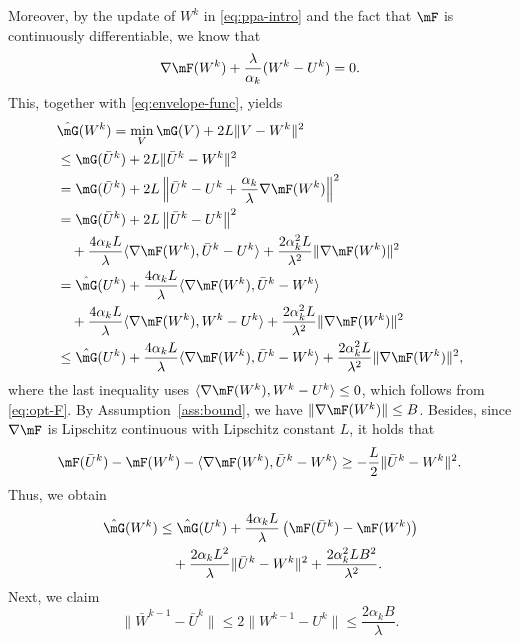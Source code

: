 Moreover, by the update of $W^k$ in \eqref{eq:ppa-intro} and the fact that $\mF$ is continuously differentiable, we know that
\begin{equation}
\label{eq:opt-F}
\nabla \mF(W^k) + \frac{\lambda}{\alpha_k}(W^k - U^k) = 0.
\end{equation} 
This, together with \eqref{eq:envelope-func}, yields
\begin{align*}
& \hat{\mG}(W^k) = \min_V \mG(V) + 2L\|V - W^k\|^2 \\
& \leq \mG(\bar{U}^k) + 2L\|\bar{U}^k - W^k\|^2 \\
& = \mG(\bar{U}^k) + 2L\left\|\bar{U}^k - U^k + \frac{\alpha_k}{\lambda}\nabla\mF(W^k) \right\|^2 \\
& = \mG(\bar{U}^k) + 2L\left\|\bar{U}^k - U^k\right\|^2 \\
& \quad + \frac{4\alpha_kL}{\lambda}\langle \nabla\mF(W^k), \bar{U}^k - U^k \rangle + \frac{2\alpha_k^2L}{\lambda^2}\|\nabla\mF(W^k)\|^2 \\
& = \hat{\mG}(U^k)+ \frac{4\alpha_kL}{\lambda}\langle \nabla\mF(W^k), \bar{U}^k - W^k \rangle \\
& \quad + \frac{4\alpha_kL}{\lambda}\langle \nabla\mF(W^k), W^k - U^k \rangle + \frac{2\alpha_k^2L}{\lambda^2}\|\nabla\mF(W^k)\|^2 \\
& \leq \hat{\mG}(U^k) + \frac{4\alpha_kL}{\lambda}\langle \nabla\mF(W^k), \bar{U}^k - W^k \rangle +  \frac{2\alpha_k^2L}{\lambda^2}\|\nabla\mF(W^k)\|^2,
\end{align*}
where the last inequality uses $\langle \nabla \mF(W^k), W^k - U^k\rangle \leq 0$, which follows from \eqref{eq:opt-F}. By Assumption~\ref{ass:bound}, we have $\|\nabla\mF(W^k)\| \leq B$. Besides, since $\nabla\mF$ is Lipschitz continuous with Lipschitz constant $L$, it holds that
$$ \mF(\bar{U}^k) - \mF(W^k) - \langle \nabla \mF(W^k), \bar{U}^k - W^k \rangle \geq -\frac{L}{2}\|\bar{U}^k - W^k\|^2. $$
Thus, we obtain
\begin{equation}
\label{eq:decrease-F}
\begin{aligned}
\hat{\mG}(W^k) & \leq \hat{\mG}(U^k) + \frac{4\alpha_kL}{\lambda}\left(\mF(\bar{U}^k) - \mF(W^k)\right) \\
& \quad + \frac{2\alpha_kL^2}{\lambda}\|\bar{U}^k - W^k\|^2 + \frac{2\alpha_k^2LB^2}{\lambda^2}. 
\end{aligned}
\end{equation}
Next, we claim
\begin{equation}
\label{eq:Lipschitz-enve}
\|\bar{W}^{k-1} - \bar{U}^k\| \leq 2\|W^{k-1} - U^k\| \leq \frac{2\alpha_kB}{\lambda}.
\end{equation}
